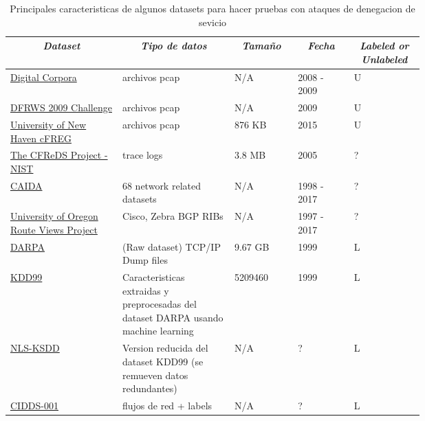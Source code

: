 \documentclass[12pt]{article}
\begin{document}
\newpage
\begin{landscape}

\begin{table}[htbp]
\centering
\begin{tabular}{|p{0.2\linewidth}|p{0.2\linewidth}|p{0.1\linewidth}|p{0.1\linewidth}|p{0.1\linewidth}|}\hline
\multicolumn{1}{|c|}{\textit{\textbf{Dataset}}} & 
\multicolumn{1}{c|}{\textit{\textbf{Tipo de datos}}} &
\multicolumn{1}{|c|}{\textit{\textbf{Tamaño}}} & 
\multicolumn{1}{|c|}{\textit{\textbf{Fecha}}} &
\multicolumn{1}{|c|}{\textit{\textbf{Labeled or Unlabeled}}} \tabularnewline \hline

\href{http://digitalcorpora.org/corpora/packet-dumps}{Digital Corpora} & 
archivos pcap &
N/A & 
2008 - 2009 & 
U 
\tabularnewline \hline

\href{https://web.archive.org/web/20160311200806/http://dfrws.org/2009/challenge/submission.shtml}{DFRWS 2009 Challenge} & 
archivos pcap &
N/A & 
2009 & 
U 
\tabularnewline \hline

\href{https://www.unhcfreg.com/datasetsandtools}{University of New Haven cFREG} & 
archivos pcap &
876 KB & 
2015 & 
U 
\tabularnewline \hline

\href{https://www.cfreds.nist.gov/dfrws/Rhino_Hunt.html}{The CFReDS Project - NIST} & 
trace logs &
3.8 MB & 
2005 & 
? 
\tabularnewline \hline

\href{http://www.caida.org/data/overview/}{CAIDA} & 
68 network related datasets &
N/A & 
1998 - 2017 & 
? 
\tabularnewline \hline

\href{http://www.routeviews.org/routeviews/}{University of Oregon Route Views Project} & 
Cisco, Zebra BGP RIBs &
N/A & 
1997 - 2017 & 
? 
\tabularnewline \hline

\href{https://www.ll.mit.edu/r-d/datasets}{DARPA} & 
(Raw dataset) TCP/IP Dump  files &
9.67 GB & 
1999 & 
L 
\tabularnewline \hline

\href{http://kdd.ics.uci.edu/databases/kddcup99/kddcup99.html}{KDD99} & 
Caracteristicas extraidas y preprocesadas del dataset DARPA usando machine learning &
5209460 & 
1999 & 
L 
\tabularnewline \hline

\href{http://www.unb.ca/cic/datasets/nsl.html}{NLS-KSDD} & 
Version reducida del dataset KDD99 (se remueven datos redundantes) &
N/A &
? & 
L 
\tabularnewline \hline


\href{https://www.hs-coburg.de/forschung-kooperation/forschungsprojekte-oeffentlich/ingenieurwissenschaften/cidds-coburg-intrusion-detection-data-sets.html}{CIDDS-001} & 
flujos de red + labels &
N/A &
? & 
L 
\tabularnewline \hline

\end{tabular}
\caption{Principales caracteristicas de algunos datasets para hacer pruebas con ataques de denegacion de sevicio} \label{tab:sometab}
\end{table} 

\end{landscape}
\newpage
\end{document}
